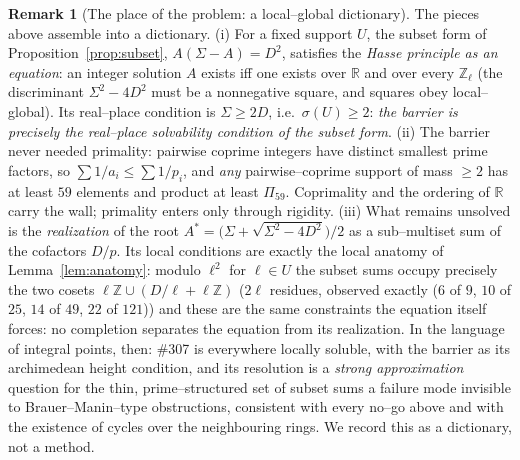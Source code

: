 \documentclass[11pt]{article}
\theoremstyle{definition}
\newtheorem{remark}[theorem]{Remark}
\begin{document}
\begin{remark}[The place of the problem: a local--global dictionary]\label{rem:place}
The pieces above assemble into a dictionary. \textup{(i)} For a fixed support $U$, the subset form of
Proposition~\ref{prop:subset}, $A(\Sigma-A)=D^2$, satisfies the \emph{Hasse principle as an equation}:
an integer solution $A$ exists iff one exists over $\mathbb{R}$ and over every $\mathbb{Z}_\ell$ (the
discriminant $\Sigma^2-4D^2$ must be a nonnegative square, and squares obey local--global). Its
real--place condition is $\Sigma\ge2D$, i.e.\ $\sigma(U)\ge2$: \emph{the barrier is precisely the
real--place solvability condition of the subset form}. \textup{(ii)} The barrier never needed
primality: pairwise coprime integers have distinct smallest prime factors, so
$\sum 1/a_i\le\sum1/p_i$, and \emph{any} pairwise--coprime support of mass $\ge2$ has at least $59$
elements and product at least $\Pi_{59}$. Coprimality and the ordering of $\mathbb{R}$ carry the wall;
primality enters only through rigidity. \textup{(iii)} What remains unsolved is the \emph{realization}
of the root $A^*=\bigl(\Sigma+\sqrt{\Sigma^2-4D^2}\bigr)/2$ as a sub--multiset sum of the cofactors
$D/p$. Its local conditions are exactly the local anatomy of Lemma~\ref{lem:anatomy}: modulo $\ell^2$
for $\ell\in U$ the subset sums occupy precisely the two cosets
$\ell\mathbb{Z}\cup(D/\ell+\ell\mathbb{Z})$ ($2\ell$ residues, observed exactly ($6$ of $9$, $10$ of
$25$, $14$ of $49$, $22$ of $121$)) and these are the same constraints the equation itself forces:
no completion separates the equation from its realization. In the language of integral points, then:
\#307 is everywhere locally soluble, with the barrier as its archimedean height condition, and its
resolution is a \emph{strong approximation} question for the thin, prime--structured set of subset sums
a failure mode invisible to Brauer--Manin--type obstructions, consistent with every no--go above
and with the existence of cycles over the neighbouring rings. We record this as a dictionary, not a
method.
\end{remark}
\end{document}
